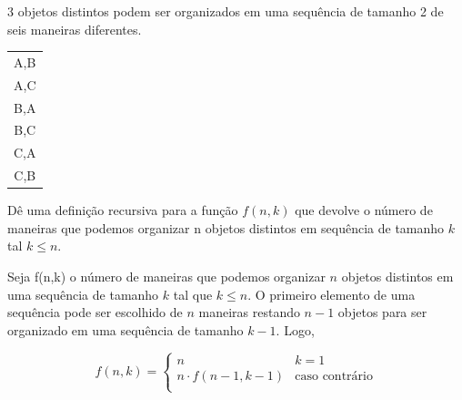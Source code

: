 \begin{exemplo}



3 objetos distintos podem ser organizados em uma sequência de tamanho 2 de seis maneiras diferentes.

\begin{center}
\begin{tabular}{c}
A,B\\
A,C\\
B,A\\
B,C\\
C,A\\
C,B\\
\end{tabular}
\end{center}

Dê uma definição recursiva para a função $f(n, k)$ que devolve o número de maneiras que podemos organizar n objetos distintos em sequência de tamanho $k$ tal $k \leq n$.


Seja f(n,k) o número de maneiras que podemos organizar $n$ objetos distintos em uma sequência de tamanho $k$ tal que $k \leq n$. O primeiro elemento de uma sequência pode ser escolhido de $n$ maneiras restando $n-1$ objetos para ser organizado em uma sequência de tamanho $k-1$. Logo,

$$
f(n,k) = 
\begin{cases}
n & k = 1\\
n \cdot f(n-1,k-1) & \text{caso contrário}\\
\end{cases}
$$

\end{exemplo}

